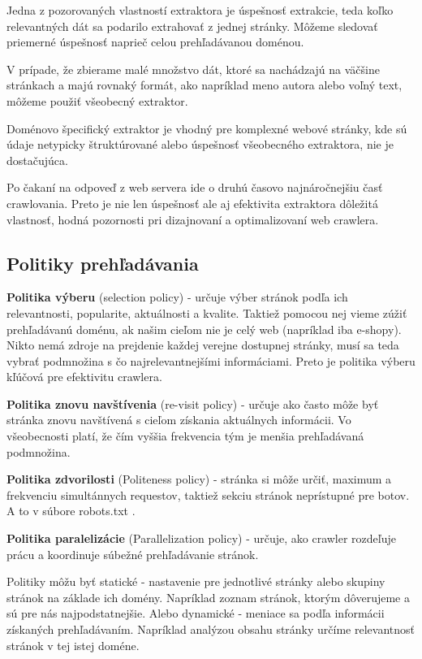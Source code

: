 Jedna z pozorovaných vlastností extraktora je úspešnosť extrakcie, teda koľko relevantných dát sa podarilo extrahovať z jednej stránky. Môžeme sledovať priemerné úspešnosť naprieč celou prehľadávanou doménou.  

V prípade, že zbierame malé množstvo dát, ktoré sa nachádzajú na väčšine stránkach a majú rovnaký formát, ako napríklad meno autora alebo voľný text, môžeme použiť všeobecný extraktor.  

Doménovo špecifický extraktor je vhodný pre komplexné webové stránky, kde sú údaje netypicky štruktúrované alebo úspešnosť všeobecného extraktora, nie je dostačujúca. 

Po čakaní na odpoveď z web servera ide o druhú časovo najnáročnejšiu časť crawlovania. Preto je nie len úspešnosť ale aj efektivita extraktora dôležitá vlastnosť, hodná pozornosti pri dizajnovaní a optimalizovaní web crawlera.

\subsection{Politiky prehľadávania}
\textbf{Politika výberu} (selection policy) - určuje výber stránok podľa ich relevantnosti, popularite, aktuálnosti a kvalite. Taktiež pomocou nej vieme zúžiť prehľadávanú doménu, ak našim cieľom nie je celý web (napríklad iba e-shopy). Nikto nemá zdroje na prejdenie každej verejne dostupnej stránky, musí sa teda vybrať podmnožina s čo najrelevantnejšími informáciami. Preto je politika výberu kľúčová pre efektivitu crawlera. 

\textbf{Politika znovu navštívenia} (re-visit policy) - určuje ako často môže byť stránka znovu navštívená s cieľom získania aktuálnych informácii. Vo všeobecnosti platí, že čím vyššia frekvencia tým je menšia prehľadávaná podmnožina. 

\textbf{Politika zdvorilosti} (Politeness policy) - stránka si môže určiť, maximum a frekvenciu simultánnych requestov, taktiež sekciu stránok neprístupné pre botov. A to v súbore robots.txt \cite{robotsTxt}. 

\textbf{Politika paralelizácie} (Parallelization policy) - určuje, ako crawler rozdeľuje prácu a koordinuje súbežné prehľadávanie stránok. 

Politiky môžu byť statické - nastavenie pre jednotlivé stránky alebo skupiny stránok na základe ich domény. Napríklad zoznam stránok, ktorým dôverujeme a sú pre nás najpodstatnejšie.
Alebo dynamické - meniace sa podľa informácii získaných prehľadávaním. Napríklad analýzou obsahu stránky určíme relevantnosť stránok v tej istej doméne. 


